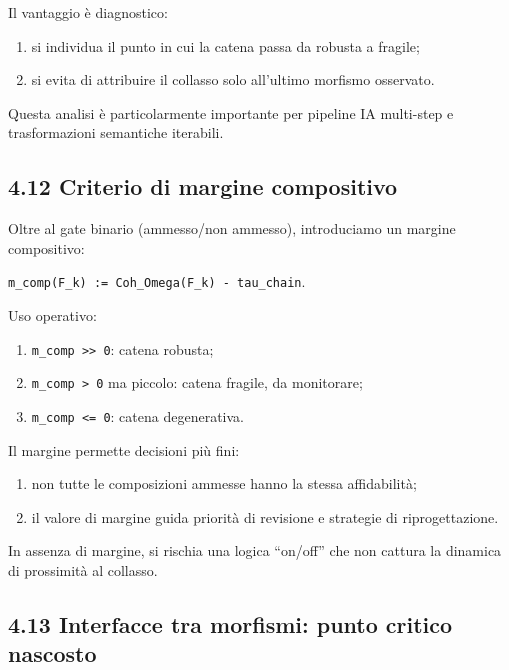 Il vantaggio è diagnostico:

\begin{enumerate}
\def\labelenumi{\arabic{enumi}.}
\tightlist
\item
  si individua il punto in cui la catena passa da robusta a fragile;
\item
  si evita di attribuire il collasso solo all'ultimo morfismo osservato.
\end{enumerate}

Questa analisi è particolarmente importante per pipeline IA multi-step e trasformazioni semantiche iterabili.

\subsection{4.12 Criterio di margine compositivo}

Oltre al gate binario (ammesso/non ammesso), introduciamo un margine compositivo:

\texttt{m\_comp(F\_k)\ :=\ Coh\_Omega(F\_k)\ -\ tau\_chain}.

Uso operativo:

\begin{enumerate}
\def\labelenumi{\arabic{enumi}.}
\tightlist
\item
  \texttt{m\_comp\ \textgreater{}\textgreater{}\ 0}: catena robusta;
\item
  \texttt{m\_comp\ \textgreater{}\ 0} ma piccolo: catena fragile, da monitorare;
\item
  \texttt{m\_comp\ \textless{}=\ 0}: catena degenerativa.
\end{enumerate}

Il margine permette decisioni più fini:

\begin{enumerate}
\def\labelenumi{\arabic{enumi}.}
\tightlist
\item
  non tutte le composizioni ammesse hanno la stessa affidabilità;
\item
  il valore di margine guida priorità di revisione e strategie di riprogettazione.
\end{enumerate}

In assenza di margine, si rischia una logica ``on/off'' che non cattura la dinamica di prossimità al collasso.

\subsection{4.13 Interfacce tra morfismi: punto critico nascosto}

